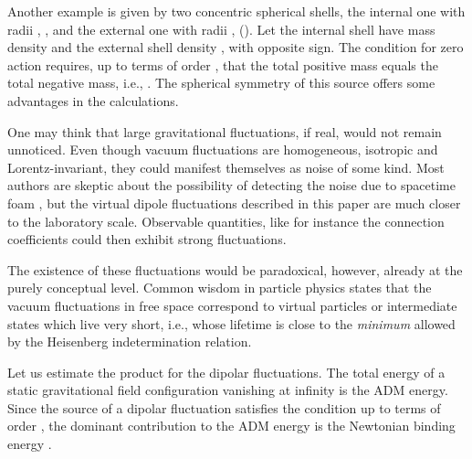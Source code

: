 \documentclass[a4paper,11pt]{article}
\begin{document}
Another example is given by 
two concentric spherical shells, the internal
one with radii \coordHE{}, \coordHE{}, and the external one with
radii \coordHE{}, \coordHE{} (\coordHE{}). Let the internal
shell have mass density \coordHE{} and the external shell
density \coordHE{}, with opposite sign. 
The condition for zero action requires,
up to terms of order \coordHE{}, that the total positive mass
equals the total negative mass, i.e.,
\coordHE{}.
The spherical symmetry of this source
offers some advantages in the calculations.

One may think that large gravitational fluctuations, if real, 
would not remain unnoticed. Even though vacuum fluctuations
are homogeneous, isotropic and Lorentz-invariant, they
could manifest themselves as noise of some kind. 
Most authors are skeptic about the possibility
of detecting the noise due to spacetime foam \cite{ame,ell},
but the virtual dipole fluctuations described in this
paper are much closer to the laboratory scale.
Observable quantities, like for instance the 
connection coefficients \myHighlight{$\Gamma^\rho_{\mu \nu}$}\coordHE{}
could then exhibit strong fluctuations.

The existence of these
fluctuations would be paradoxical, however, already 
at the purely conceptual level. Common wisdom in particle
physics states that the vacuum fluctuations in free space
correspond to virtual particles or intermediate states 
which live very short, i.e., whose
lifetime is close to the {\it minimum} allowed by the Heisenberg
indetermination relation. 

Let us estimate the product
\coordHE{} for the dipolar fluctuations. The total energy of
a static gravitational field configuration vanishing at
infinity is the ADM energy. Since the source of a
dipolar fluctuation satisfies the condition \coordHE{} up to terms of order \coordHE{}, the
dominant contribution to the ADM energy is the Newtonian
binding energy \cite{mur}.
\end{document}
